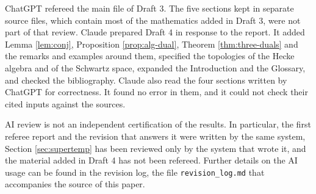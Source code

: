 \documentclass[12pt,letterpaper]{amsart}
\numberwithin{equation}{section}
\theoremstyle{definition}
\theoremstyle{remark}
\begin{document}
ChatGPT refereed the main file of Draft 3. The five sections kept in separate source files, which contain most of the mathematics added in Draft 3, were not part of that review. Claude prepared Draft 4 in response to the report. It added Lemma \ref{lem:conj}, Proposition \ref{prop:alg-dual}, Theorem \ref{thm:three-duals} and the remarks and examples around them, specified the topologies of the Hecke algebra and of the Schwartz space, expanded the Introduction and the Glossary, and checked the bibliography. Claude also read the four sections written by ChatGPT for correctness. It found no error in them, and it could not check their cited inputs against the sources.

AI review is not an independent certification of the results. In particular, the first referee report and the revision that answers it were written by the same system, Section \ref{sec:supertemp} has been reviewed only by the system that wrote it, and the material added in Draft 4 has not been refereed. Further details on the AI usage can be found in the revision log, the file \texttt{revision\_log.md} that accompanies the source of this paper.
\end{document}
